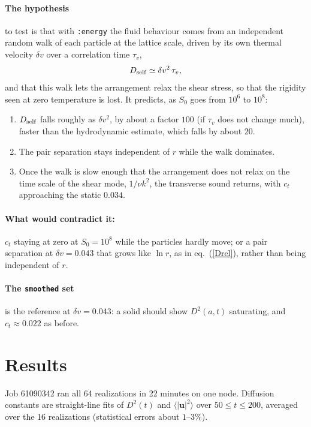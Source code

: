 \documentclass[11pt,aps,preprint,nofootinbib,superscriptaddress,tightenlines]{revtex4-2}
\def\st{\begin{equation}}
\def\stp{\end{equation}}
\def\Eq#1{eq.~(\ref{#1})}
\newcommand{\avg}[1]{\langle #1\rangle}
\let\oldparagraph\paragraph
\renewcommand{\paragraph}{\par\bigskip\oldparagraph}
\begin{document}
\paragraph{The hypothesis} to test is that with \texttt{:energy} the fluid behaviour comes from
an independent random walk of each particle at the lattice scale, driven by its own thermal
velocity $\delta v$ over a correlation time $\tau_v$,
\st
D_{\rm self}\simeq\delta v^2\,\tau_v ,
\label{walk}
\stp
and that this walk lets the arrangement relax the shear stress, so that the rigidity seen at
zero temperature is lost.  It predicts, as $S_0$ goes from $10^6$ to $10^8$:
\begin{enumerate}
\item $D_{\rm self}$ falls roughly as $\delta v^2$, by about a factor $100$ (if $\tau_v$ does not
  change much), faster than the hydrodynamic estimate, which falls by about $20$.
\item The pair separation stays independent of $r$ while the walk dominates.
\item Once the walk is slow enough that the arrangement does not relax on the time
  scale of the shear mode, $1/\nu k^2$, the transverse sound returns, with $c_t$ approaching the
  static $0.034$.
\end{enumerate}
\paragraph{What would contradict it:} $c_t$ staying at zero at $S_0=10^8$ while the
particles hardly move; or a pair separation at $\delta v=0.043$ that grows like $\ln r$, as in
\Eq{Drel}, rather than being independent of $r$.

\paragraph{The \texttt{smoothed} set} is the reference at $\delta v=0.043$: a solid should show
$D^2(a,t)$ saturating, and $c_t\approx0.022$ as before.

\section{Results}
\label{sec:results}

Job 61090342 ran all 64 realizations in 22 minutes on one node.  Diffusion constants are
straight-line fits of $D^2(t)$ and $\avg{|\bm u|^2}$ over $50\le t\le200$, averaged over the 16
realizations (statistical errors about $1$--$3\%$).
\end{document}
